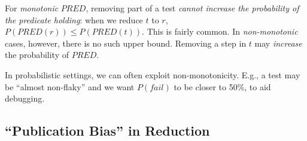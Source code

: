 For \emph{monotonic} $\mathit{PRED}$, removing part of a test \emph{cannot
increase the probability of the predicate holding}: when we reduce $t$
to $r$, $P(\mathit{PRED}(r)) \leq P(\mathit{PRED}(t))$.  This is fairly
common.  In \emph{non-monotonic} cases,
however, there is no such upper bound.  Removing a step in $t$ may
\emph{increase} the probability of $\mathit{PRED}$.

In probabilistic
settings, we can often exploit non-monotonicity.  E.g., a test may be
``almost non-flaky'' and we want $P(\mathit{fail})$ to be closer to
50\%, to aid debugging.

\subsection{``Publication Bias'' in Reduction}
\label{sec:pubbias}


